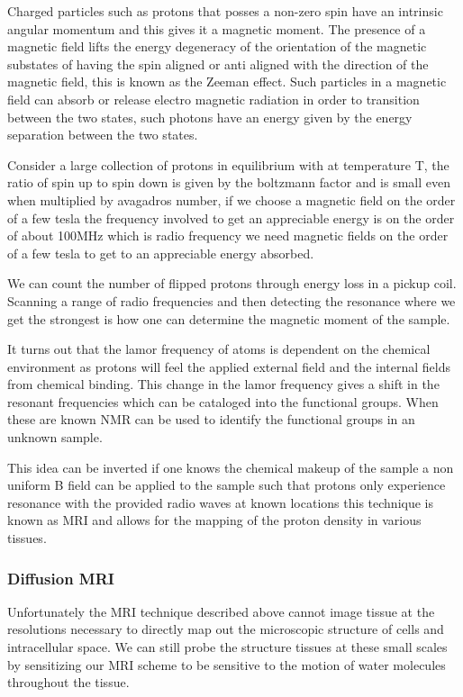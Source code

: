 Charged particles such as protons that posses a non-zero spin have an intrinsic angular momentum and this gives it a magnetic moment. The presence of a magnetic field lifts the energy degeneracy of the orientation of the magnetic substates of having the spin aligned or anti aligned with the direction of the magnetic field, this is known as the Zeeman effect. Such particles in a magnetic field can absorb or release electro magnetic radiation in order to transition between the two states, such photons have an energy given by the energy separation between the two states.

Consider a large collection of protons in equilibrium with at temperature T, the ratio of spin up to spin down is given by the boltzmann factor and is small even when multiplied by avagadros number, if we choose a magnetic field on the order of a few tesla the frequency involved to get an appreciable energy is on the order of about 100MHz which is radio frequency we need magnetic fields on the order of a few tesla to get to an appreciable energy absorbed.

We can count the number of flipped protons through energy loss in a pickup coil. Scanning a range of radio frequencies and then detecting the resonance where we get the strongest is how one can determine the magnetic moment of the sample.

It turns out that the lamor frequency of atoms is dependent on the chemical environment as protons will feel the applied external field and the internal fields from chemical binding. This change in the lamor frequency gives a shift in the resonant frequencies which can be cataloged into the functional groups. When these are known NMR can be used to identify the functional groups in an unknown sample.

This idea can be inverted if one knows the chemical makeup of the sample a non uniform B field can be applied to the sample such that protons only experience resonance with the provided radio waves at known locations this technique is known as MRI and allows for the mapping of the proton density in various tissues.

\subsubsection{Diffusion MRI}

Unfortunately the MRI technique described above cannot image tissue at the resolutions necessary to directly map out the microscopic structure of cells and intracellular space. We can still probe the structure tissues at these small scales by sensitizing our MRI scheme to be sensitive to the motion of water molecules throughout the tissue.

